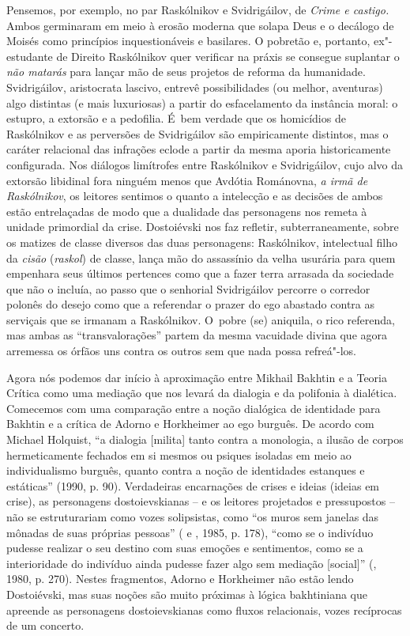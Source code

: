 {Pensemos, por exemplo, no par Raskólnikov e Svidrigáilov, de \emph{Crime
e castigo.} Ambos germinaram em meio à erosão moderna que solapa Deus e
o decálogo de Moisés como princípios inquestionáveis e basilares. O
pobretão e, portanto, ex"-estudante de Direito Raskólnikov quer verificar
na práxis se consegue suplantar o \emph{não matarás} para lançar mão de
seus projetos de reforma da humanidade. Svidrigáilov, aristocrata
lascivo, entrevê possibilidades (ou melhor, aventuras) algo distintas (e
mais luxuriosas) a partir do esfacelamento da instância moral: o
estupro, a extorsão e a pedofilia. É~bem verdade que os homicídios de
Raskólnikov e as perversões de Svidrigáilov são empiricamente distintos,
mas o caráter relacional das infrações eclode a partir da mesma aporia
historicamente configurada. Nos diálogos limítrofes entre Raskólnikov e
Svidrigáilov, cujo alvo da extorsão libidinal fora ninguém menos que
Avdótia Románovna, \emph{a irmã de Raskólnikov}, os leitores sentimos o
quanto a intelecção e as decisões de ambos estão entrelaçadas de modo
que a dualidade das personagens nos remeta à unidade primordial da
crise. Dostoiévski nos faz refletir, subterraneamente, sobre os matizes
de classe diversos das duas personagens: Raskólnikov, intelectual filho
da \emph{cisão} (\emph{raskol}) de classe, lança mão do assassínio da
velha usurária para quem empenhara seus últimos pertences como que a
fazer terra arrasada da sociedade que não o incluía, ao passo que o
senhorial Svidrigáilov percorre o corredor polonês do desejo como que a
referendar o prazer do ego abastado contra as serviçais que se irmanam a
Raskólnikov. O~pobre (se) aniquila, o rico referenda, mas ambas as
``transvalorações'' partem da mesma vacuidade divina que agora arremessa
os órfãos uns contra os outros sem que nada possa refreá"-los.

Agora nós podemos dar início à aproximação entre Mikhail Bakhtin e a
Teoria Crítica como uma mediação que nos levará da dialogia e da
polifonia à dialética. Comecemos com uma comparação entre a noção
dialógica de identidade para Bakhtin e a crítica de Adorno e Horkheimer
ao ego burguês. De acordo com Michael Holquist, ``a dialogia
{[}milita{]} tanto contra a monologia, a ilusão de corpos hermeticamente
fechados em si mesmos ou psiques isoladas em meio ao individualismo
burguês, quanto contra a noção de identidades estanques e estáticas''
(1990, p. 90). Verdadeiras encarnações de crises e ideias (ideias em
crise), as personagens dostoievskianas -- e os leitores projetados e
pressupostos -- não se estruturariam como vozes solipsistas, como ``os
muros sem janelas das mônadas de suas próprias pessoas'' ( e
, 1985, p. 178), ``como se o indivíduo pudesse realizar o seu
destino com suas emoções e sentimentos, como se a interioridade do
indivíduo ainda pudesse fazer algo sem mediação {[}social{]}'' (,
1980, p. 270). Nestes fragmentos, Adorno e Horkheimer não estão lendo
Dostoiévski, mas suas noções são muito próximas à lógica bakhtiniana que
apreende as personagens dostoievskianas como fluxos relacionais, vozes
recíprocas de um concerto.

}
